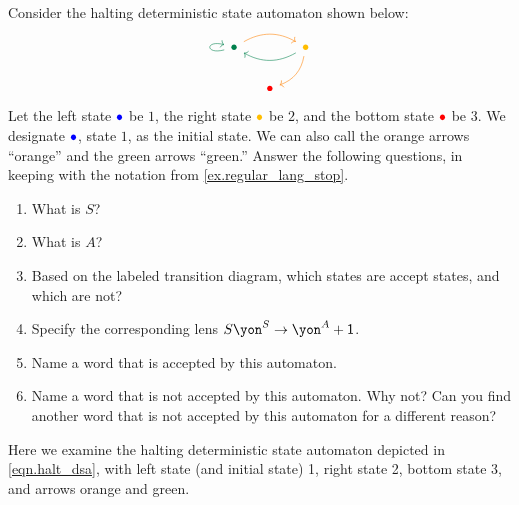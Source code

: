 \documentclass[Book-Poly]{subfiles}
\begin{document}
\begin{exercise}\label{exc.halt_dsa}
Consider the halting deterministic state automaton shown below:
\begin{equation} \label{eqn.halt_dsa}
\begin{tikzcd}[column sep=small]
	\bul[dgreen]\ar[rr, bend left, orange]\ar[loop left, dgreen]&&
	\bul[dyellow]\ar[dl, bend left, orange]\ar[ll, dgreen, bend left]\\&
	\bul[red]
\end{tikzcd}
\end{equation}
Let the left state $\bul[blue]$ be $1$, the right state $\bul[dyellow]$ be $2$, and the bottom state $\bul[red]$ be $3$.
We designate $\bul[blue]$, state $1$, as the initial state.
We can also call the orange arrows ``{\color{orange}orange}'' and the green arrows ``{\color{dgreen}green}.''
Answer the following questions, in keeping with the notation from \cref{ex.regular_lang_stop}.

\begin{enumerate}
	\item What is $S$?
	\item What is $A$?
	\item Based on the labeled transition diagram, which states are accept states, and which are not?
	\item Specify the corresponding lens $S\yon^S\to\yon^A+\1$.
	\item Name a word that is accepted by this automaton.
	\item Name a word that is not accepted by this automaton.
	Why not?
	Can you find another word that is not accepted by this automaton for a different reason?
\qedhere
\end{enumerate}
\begin{solution}
Here we examine the halting deterministic state automaton depicted in \eqref{eqn.halt_dsa}, with left state (and initial state) 1, right state 2, bottom state 3, and arrows {\color{orange}orange} and {\color{dgreen}green}.


\end{solution}
\end{exercise}
\end{document}
